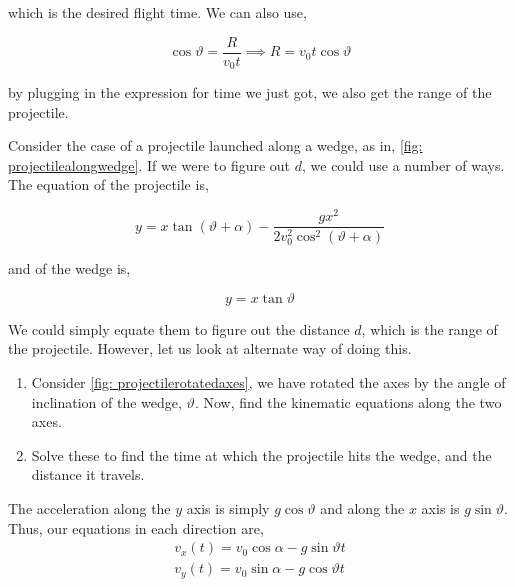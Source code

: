 \begin{exc}
\begin{solution}
        which is the desired flight time. We can also use,

        \begin{equation*}
            \cos\vartheta = \frac{R}{v_0t} \implies R = v_0t\cos\vartheta
        \end{equation*}

        by plugging in the expression for time we just got, we also get the range of the projectile. 
    \end{solution}
    
    \begin{exercise}[points = 3]
        Consider the case of a projectile launched along a wedge, as in,
        \cref{fig: projectilealongwedge}. If we were to figure out \(d\), we could 
        use a number of ways. The equation of the projectile is,

        \begin{equation*}
            y = x\tan(\vartheta+\alpha) - \frac{gx^2}{2v_0^2\cos^2(\vartheta+\alpha)}
        \end{equation*}

        and of the wedge is,

        \begin{equation*}
            y = x\tan\vartheta 
        \end{equation*}

        We could simply equate them to figure out the distance \(d\), which is the range of the projectile.
        However, let us look at alternate way of doing this.

        \begin{enumerate}[label=(\alph*)]
            \item Consider \cref{fig: projectilerotatedaxes}, we have rotated the axes by the angle of inclination of the wedge, \(\vartheta\). Now, find the kinematic equations along the two axes.
            \item Solve these to find the time at which the projectile hits the wedge, and the distance it travels. 
        \end{enumerate}

    \end{exercise}

    \begin{solution}
        The acceleration along the \(y\) axis is simply \(g\cos\vartheta\) and along the \(x\) axis 
        is \(g\sin\vartheta\). Thus, our equations in each direction are,
            \begin{align*}
                v_x(t) = v_0\cos\alpha - g\sin\vartheta t\\
                v_y(t) = v_0\sin\alpha - g\cos\vartheta t 
            \end{align*}


\end{solution}
\end{exc}
